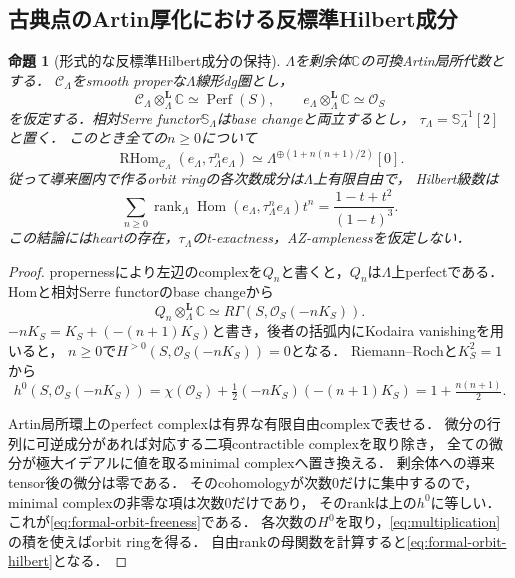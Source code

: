\documentclass[11pt,a4paper]{ltjsarticle}
\newtheorem{proposition}[theorem]{命題}
\theoremstyle{definition}
\newcommand{\OO}{\mathcal O}
\newcommand{\SSer}{\mathbb S}
\newcommand{\RHom}{\operatorname{RHom}}
\newcommand{\Hom}{\operatorname{Hom}}
\newcommand{\Perf}{\operatorname{Perf}}
\begin{document}
\subsection{古典点のArtin厚化における反標準Hilbert成分}

\begin{proposition}[形式的な反標準Hilbert成分の保持]
\label{prop:formal-hilbert}
$\Lambda$を剰余体$\mathbb C$の可換Artin局所代数とする．
$\mathcal C_\Lambda$をsmooth properな$\Lambda$線形dg圏とし，
\[
 \mathcal C_\Lambda\otimes_\Lambda^{\mathbf L}\mathbb C\simeq\Perf(S),
 \qquad e_\Lambda\otimes_\Lambda^{\mathbf L}\mathbb C\simeq\OO_S
\]
を仮定する．相対Serre functor$\SSer_\Lambda$はbase changeと両立するとし，
$\tau_\Lambda=\SSer_\Lambda^{-1}[2]$と置く．
このとき全ての$n\geq0$について
\begin{equation}\label{eq:formal-orbit-freeness}
 \RHom_{\mathcal C_\Lambda}(e_\Lambda,\tau_\Lambda^ne_\Lambda)
 \simeq\Lambda^{\oplus(1+n(n+1)/2)}[0].
\end{equation}
従って導来圏内で作るorbit ringの各次数成分は$\Lambda$上有限自由で，
Hilbert級数は
\begin{equation}\label{eq:formal-orbit-hilbert}
 \sum_{n\geq0}\operatorname{rank}_\Lambda
 \Hom(e_\Lambda,\tau_\Lambda^ne_\Lambda)t^n
 =\frac{1-t+t^2}{(1-t)^3}.
\end{equation}
この結論にはheartの存在，$\tau_\Lambda$のt-exactness，AZ-amplenessを仮定しない．
\end{proposition}

\begin{proof}
propernessにより左辺のcomplexを$Q_n$と書くと，$Q_n$は$\Lambda$上perfectである．
Homと相対Serre functorのbase changeから
\[
 Q_n\otimes_\Lambda^{\mathbf L}\mathbb C
 \simeq R\Gamma(S,\OO_S(-nK_S)).
\]
$-nK_S=K_S+(-(n+1)K_S)$と書き，後者の括弧内にKodaira vanishingを用いると，
$n\geq0$で$H^{>0}(S,\OO_S(-nK_S))=0$となる．
Riemann--Rochと$K_S^2=1$から
\[
 h^0(S,\OO_S(-nK_S))
 =\chi(\OO_S)+\tfrac12(-nK_S)(-(n+1)K_S)
 =1+\tfrac{n(n+1)}2.
\]

Artin局所環上のperfect complexは有界な有限自由complexで表せる．
微分の行列に可逆成分があれば対応する二項contractible complexを取り除き，
全ての微分が極大イデアルに値を取るminimal complexへ置き換える．
剰余体への導来tensor後の微分は零である．
そのcohomologyが次数0だけに集中するので，minimal complexの非零な項は次数0だけであり，
そのrankは上の$h^0$に等しい．これが\eqref{eq:formal-orbit-freeness}である．
各次数の$H^0$を取り，\eqref{eq:multiplication}の積を使えばorbit ringを得る．
自由rankの母関数を計算すると\eqref{eq:formal-orbit-hilbert}となる．
\end{proof}
\end{document}
